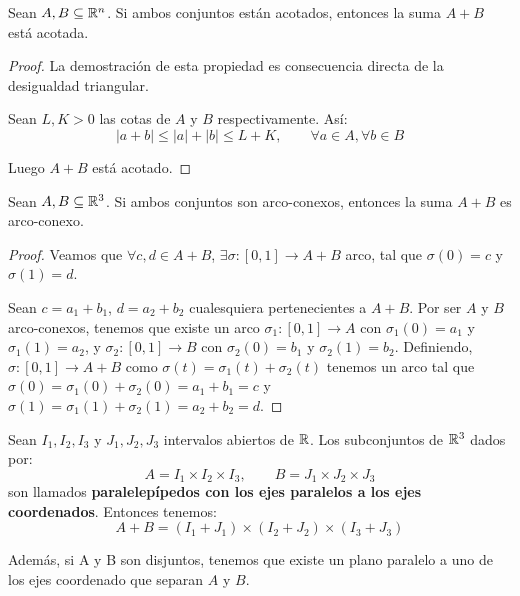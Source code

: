 \begin{lemma}
Sean $A,B \subseteq \mathbb{R}^n$. Si ambos conjuntos están acotados, entonces la suma $A+B$ está acotada.
\end{lemma}
\begin{proof}
La demostración de esta propiedad es consecuencia directa de la desigualdad triangular.

Sean $L,K > 0$ las cotas de $A$ y $B$ respectivamente. Así:
\begin{equation*}
    |a+b| \leq |a|+|b| \leq L + K, \qquad \forall a \in A, \forall b\in B
\end{equation*}

Luego $A+B$ está acotado.
\end{proof}

\begin{lemma}
Sean $A,B \subseteq \mathbb{R}^3$. Si ambos conjuntos son arco-conexos, entonces la suma $A+B$ es arco-conexo.
\end{lemma}
\begin{proof}
Veamos que $\forall c,d \in A+B$, $\exists \sigma: [0,1] \longrightarrow A+B$ arco, tal que $\sigma(0)=c$ y $\sigma(1)=d$.

Sean $c=a_1 + b_1$, $d=a_2+b_2$ cualesquiera pertenecientes a $A+B$. Por ser $A$ y $B$ arco-conexos, tenemos que existe un arco $\sigma_1: [0,1] \longrightarrow A$ con $\sigma_1(0)=a_1$ y $\sigma_1(1)=a_2$, y $\sigma_2: [0,1] \longrightarrow B$ con $\sigma_2(0)=b_1$ y $\sigma_2(1)=b_2$. Definiendo, $\sigma: [0,1] \longrightarrow A+B$ como $\sigma(t) = \sigma_1(t) + \sigma_2(t)$ tenemos un arco tal que $\sigma(0)=\sigma_1(0) + \sigma_2(0) = a_1+b_1 = c$ y $\sigma(1)=\sigma_1(1) + \sigma_2(1) = a_2+b_2 = d$.
\end{proof}

\begin{lemma}\label{paralelepipedoslemma}
Sean $I_1, I_2, I_3$ y $J_1, J_2, J_3$ intervalos abiertos de $\mathbb{R}$. Los subconjuntos de $\mathbb{R}^3$ dados por:
%
\begin{equation*}
    A = I_1 \times I_2 \times I_3, \qquad B = J_1 \times J_2 \times J_3
\end{equation*}
%
son llamados \textbf{paralelepípedos con los ejes paralelos a los ejes coordenados}. Entonces tenemos:
%
\begin{equation*}
    A + B = (I_1 + J_1) \times (I_2 + J_2) \times (I_3 + J_3)
\end{equation*}

Además, si A y B son disjuntos, tenemos que existe un plano paralelo a uno de los ejes coordenado que separan $A$ y $B$.
\end{lemma}

